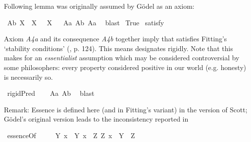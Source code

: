 \begin{isabellebody}
\begin{isamarkuptext}%
Following lemma was originally assumed by G\"odel as an axiom:%
\end{isamarkuptext}\isamarkuptrue%
\isamarkupfalse%
\ A{}b{\isacharcolon}\ {\isachardoublequoteopen}{\isasymlfloor}\isactrlbold {\isasymforall}X{\isachardot}\ \isactrlbold {\isasymnot}{\isacharparenleft}{\isasymP}\ X{\isacharparenright}\ \isactrlbold {\isasymrightarrow}\ \isactrlbold {\isasymbox}\isactrlbold {\isasymnot}{\isacharparenleft}{\isasymP}\ X{\isacharparenright}{\isasymrfloor}{\isachardoublequoteclose}%
\ %
%
\isamarkupfalse%
\ A{}a\ A{}b\ A{}a\ \isamarkupfalse%
\ blast%
%
%
\isanewline
{}\isamarkupfalse%
\ True\ \isamarkupfalse%
{\isacharbrackleft}satisfy{\isacharbrackright}%
\ %
%
\isamarkupfalse%
\ %
%
%
%
%
\begin{isamarkuptext}%
Axiom \emph{A4a} and its consequence \emph{A4b} together imply that \isa{{\isasymP}} satisfies Fitting's
`stability conditions' (\cite{Fitting}, p. 124). This means \isa{{\isasymP}} designates rigidly.
Note that this makes for an \emph{essentialist} assumption which may be considered controversial by
some philosophers: every property considered positive in our world (e.g. honesty) is necessarily so.%
\end{isamarkuptext}\isamarkuptrue%
\isamarkupfalse%
\ {\isachardoublequoteopen}{\isasymlfloor}rigidPred\ {\isasymP}{\isasymrfloor}{\isachardoublequoteclose}%
\ %
%
\isamarkupfalse%
\ A{}a\ A{}b\ \isamarkupfalse%
\ blast%
%
%
%
\begin{isamarkuptext}%
Remark: Essence is defined here (and in Fitting's variant) in the version of Scott; G\"odel's original version leads to the inconsistency
 reported in \cite{C55,C60}%
\end{isamarkuptext}\isamarkuptrue%
\isamarkupfalse%
\ essenceOf{\isacharcolon}{\isacharcolon}{\isachardoublequoteopen}{\isasymup}{\isasymlangle}{\isasymup}{\isasymlangle}{\isasymzero}{\isasymrangle}{\isacharcomma}{\isasymzero}{\isasymrangle}{\isachardoublequoteclose}\ {\isacharparenleft}{\isachardoublequoteopen}{\isasymE}{\isachardoublequoteclose}{\isacharparenright}\ \isanewline
\ \ {\isachardoublequoteopen}{\isasymE}\ Y\ x\ {\isasymequiv}\ {\isacharparenleft}Y\ x{\isacharparenright}\ \isactrlbold {\isasymand}\ {\isacharparenleft}\isactrlbold {\isasymforall}Z{\isachardot}\ Z\ x\ \isactrlbold {\isasymrightarrow}\ Y\ {\isasymRrightarrow}\ Z{\isacharparenright}{\isachardoublequoteclose}\ \ \ \isanewline

\end{isabellebody}
